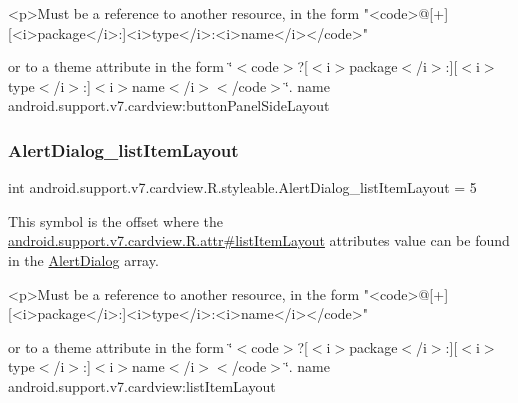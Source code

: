 \begin{DoxyVerb}      <p>Must be a reference to another resource, in the form "<code>@[+][<i>package</i>:]<i>type</i>:<i>name</i></code>"
\end{DoxyVerb}
 or to a theme attribute in the form \char`\"{}$<$code$>$?\mbox{[}$<$i$>$package$<$/i$>$\+:\mbox{]}\mbox{[}$<$i$>$type$<$/i$>$\+:\mbox{]}$<$i$>$name$<$/i$>$$<$/code$>$\char`\"{}.  name android.\+support.\+v7.\+cardview\+:button\+Panel\+Side\+Layout \mbox{\label{classandroid_1_1support_1_1v7_1_1cardview_1_1R_1_1styleable_a137cea4ff1985f8adf66f24c04789f6b}} 
\subsubsection{\texorpdfstring{Alert\+Dialog\+\_\+list\+Item\+Layout}{AlertDialog\_listItemLayout}}
{\footnotesize\ttfamily int android.\+support.\+v7.\+cardview.\+R.\+styleable.\+Alert\+Dialog\+\_\+list\+Item\+Layout = 5\hspace{0.3cm}{\ttfamily [static]}}

This symbol is the offset where the \hyperlink{classandroid_1_1support_1_1v7_1_1cardview_1_1R_1_1attr_afd49174db57b9f2cf1ab07944689c3ef}{android.\+support.\+v7.\+cardview.\+R.\+attr\#list\+Item\+Layout} attribute\textquotesingle{}s value can be found in the \hyperlink{classandroid_1_1support_1_1v7_1_1cardview_1_1R_1_1styleable_a44fc620801e3af4c8b4e7ef1fee84a2d}{Alert\+Dialog} array.

\begin{DoxyVerb}      <p>Must be a reference to another resource, in the form "<code>@[+][<i>package</i>:]<i>type</i>:<i>name</i></code>"
\end{DoxyVerb}
 or to a theme attribute in the form \char`\"{}$<$code$>$?\mbox{[}$<$i$>$package$<$/i$>$\+:\mbox{]}\mbox{[}$<$i$>$type$<$/i$>$\+:\mbox{]}$<$i$>$name$<$/i$>$$<$/code$>$\char`\"{}.  name android.\+support.\+v7.\+cardview\+:list\+Item\+Layout \mbox{\label{classandroid_1_1support_1_1v7_1_1cardview_1_1R_1_1styleable_a2c444e3b02b30ceb07374196ddb5a9dd}} 
